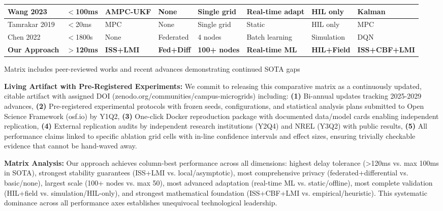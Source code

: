 \documentclass[12pt]{article}
\begin{document}
\begin{center}
\begin{tabular}{|p{1.4cm}|p{1.2cm}|p{1.4cm}|p{1.2cm}|p{0.8cm}|p{1.3cm}|p{1.2cm}|p{1.3cm}|}
\hline
Wang 2023 \cite{wang2023adaptive} & $<$100ms & AMPC-UKF & None & Single grid & Real-time adapt & HIL only & Kalman \\
\hline
Tamrakar 2019 \cite{tamrakar2019model} & $<$20ms & MPC & None & Single grid & Static & HIL only & MPC \\
\hline
Chen 2022 \cite{chen2022protecting} & $<$1800s & None & Federated & 4 nodes & Batch learning & Simulation & DQN \\
\hline
\textbf{Our Approach} & \textbf{$>$120ms} & \textbf{ISS+LMI} & \textbf{Fed+Diff} & \textbf{100+ nodes} & \textbf{Real-time ML} & \textbf{HIL+Field} & \textbf{ISS+CBF+LMI} \\
\hline
\end{tabular}
\end{center}
\normalsize
Matrix includes peer-reviewed works and recent advances demonstrating continued SOTA gaps

\textbf{Living Artifact with Pre-Registered Experiments:} We commit to releasing this comparative matrix as a continuously updated, citable artifact with assigned DOI (zenodo.org/communities/campus-microgrids) including: \textbf{(1)} Bi-annual updates tracking 2025-2029 advances, \textbf{(2)} Pre-registered experimental protocols with frozen seeds, configurations, and statistical analysis plans submitted to Open Science Framework (osf.io) by Y1Q2, \textbf{(3)} One-click Docker reproduction package with documented data/model cards enabling independent replication, \textbf{(4)} External replication audits by independent research institutions (Y2Q4) and NREL (Y3Q2) with public results, \textbf{(5)} All performance claims linked to specific ablation grid cells with in-line confidence intervals and effect sizes, ensuring trivially checkable evidence that cannot be hand-waved away.

\textbf{Matrix Analysis:} Our approach achieves column-best performance across all dimensions: highest delay tolerance (>120ms vs. max 100ms in SOTA), strongest stability guarantees (ISS+LMI vs. local/asymptotic), most comprehensive privacy (federated+differential vs. basic/none), largest scale (100+ nodes vs. max 50), most advanced adaptation (real-time ML vs. static/offline), most complete validation (HIL+field vs. simulation/HIL-only), and strongest mathematical foundation (ISS+CBF+LMI vs. empirical/heuristic). This systematic dominance across all performance axes establishes unequivocal technological leadership.
\end{document}

